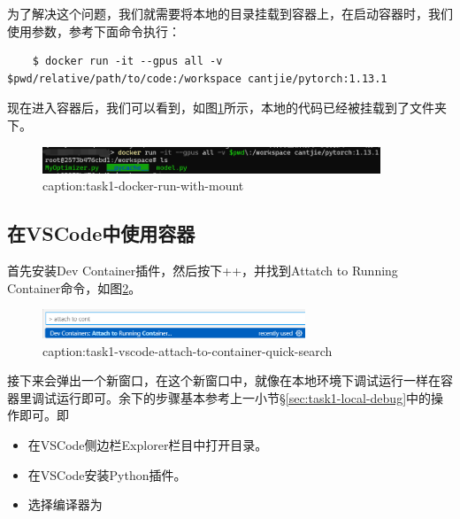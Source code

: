 为了解决这个问题，我们就需要将本地的目录挂载到容器上，在启动容器时，我们使用参数，参考下面命令执行：
\begin{lstlisting}
    $ docker run -it --gpus all -v $pwd/relative/path/to/code:/workspace cantjie/pytorch:1.13.1
\end{lstlisting}

现在进入容器后，我们可以看到，如图\ref{fig:task1-docker-run-with-mount}所示，本地的代码已经被挂载到了\graylstinline{\workspace}文件夹下。
\begin{figure}[htbp]
	\centering
	\includegraphics[width=0.9\textwidth]{figures/task1-docker-run-with-mount.png}
	\caption{caption:task1-docker-run-with-mount}
	\label{fig:task1-docker-run-with-mount}
\end{figure}

\subsection{在VSCode中使用容器}

首先安装Dev Container插件，然后按下++，并找到Attatch to Running Container命令，如图\ref{fig:task1-vscode-attach-to-container-quick-search}。
\begin{figure}[htbp]
	\centering
	\includegraphics[width=0.7\textwidth]{figures/task1-vscode-attach-to-container-quick-search.png}
	\caption{caption:task1-vscode-attach-to-container-quick-search}
	\label{fig:task1-vscode-attach-to-container-quick-search}
\end{figure}

接下来会弹出一个新窗口，在这个新窗口中，就像在本地环境下调试运行一样在容器里调试运行即可。余下的步骤基本参考上一小节\S\ref{sec:task1-local-debug}中的操作即可。即
\begin{itemize}
    \item 在VSCode侧边栏Explorer栏目中打开目录。
    \item 在VSCode安装Python插件。
    \item 选择编译器为
\end{itemize}

